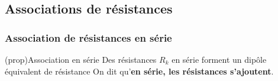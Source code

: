 \documentclass[../../main/main.tex]{subfiles}
\begin{document}
\vspace{-10pt}
\subsection{Associations de résistances}
\subsubsection{Association de résistances en série}
\begin{tcb*}[label=prop:rserie, sidebyside, righthand ratio=.4](prop){Association en série}
	Des résistances $R_k$ en série forment un dipôle équivalent de
	résistance
	\psw{%
		\[
			\boxed{R\ind{eq} = \sum_k R_k}
		\]
	}%
	On dit qu'\textbf{en série, les résistances s'ajoutent}.
	\tcblower
	\begin{center}
	\end{center}
\end{tcb*}
\end{document}
